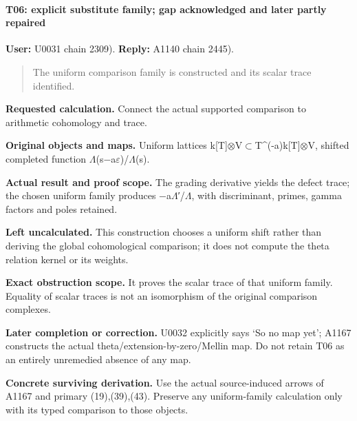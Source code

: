\paragraph{T06: explicit substitute family; gap acknowledged and later
partly
repaired}\label{t06-explicit-substitute-family-gap-acknowledged-and-later-partly-repaired}

\textbf{User:} U0031
\protect{} chain 2309).
\textbf{Reply:} A1140
\protect{} chain 2445).

\begin{quote}
The uniform comparison family is constructed and its scalar trace
identified.
\end{quote}

\textbf{Requested calculation.} Connect the actual supported comparison
to arithmetic cohomology and trace.

\textbf{Original objects and maps.} Uniform lattices
k[T]\allowbreak{}\ensuremath{⊗}\allowbreak{}V\allowbreak{}\ensuremath{⊂}\allowbreak{}T\textasciicircum{}(-a)k[T]\allowbreak{}\ensuremath{⊗}\allowbreak{}V,
shifted completed function
\allowbreak{}\ensuremath{Λ}\allowbreak{}(s\allowbreak{}\ensuremath{−}\allowbreak{}a\allowbreak{}\ensuremath{ε}\allowbreak{})/\allowbreak{}\ensuremath{Λ}\allowbreak{}(s).

\textbf{Actual result and proof scope.} The grading derivative yields
the defect trace; the chosen uniform family produces
\allowbreak{}\ensuremath{−}\allowbreak{}a\allowbreak{}\ensuremath{Λ}\allowbreak{}′/\allowbreak{}\ensuremath{Λ}\allowbreak{},
with discriminant, primes, gamma factors and poles retained.

\textbf{Left uncalculated.} This construction chooses a uniform shift
rather than deriving the global cohomological comparison; it does not
compute the theta relation kernel or its weights.

\textbf{Exact obstruction scope.} It proves the scalar trace of that
uniform family. Equality of scalar traces is not an isomorphism of the
original comparison complexes.

\textbf{Later completion or correction.} U0032 explicitly says `So no
map yet'; A1167 constructs the actual theta/extension-by-zero/Mellin
map. Do not retain T06 as an entirely unremedied absence of any map.

\textbf{Concrete surviving derivation.} Use the actual source-induced
arrows of A1167 and primary (19),(39),(43). Preserve any uniform-family
calculation only with its typed comparison to those objects.

